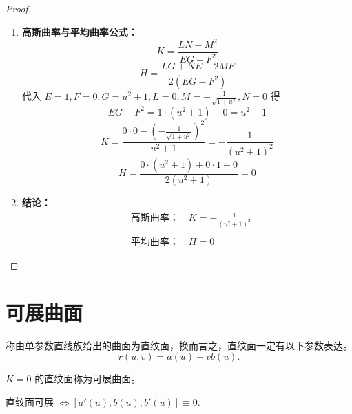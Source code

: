 \documentclass[lang=cn,10pt,thmcnt=section]{elegantbook}
\begin{document}
\begin{proof}
\begin{enumerate}
        \item \textbf{高斯曲率与平均曲率公式：}
        \[
        K = \frac{LN - M^2}{EG - F^2}
        \]
        \[
        H = \frac{LG + NE - 2MF}{2(EG - F^2)}
        \]
        代入 $E=1, F=0, G=u^2+1, L=0, M=-\frac{1}{\sqrt{1+u^2}}, N=0$ 得
        \[
        EG - F^2 = 1 \cdot (u^2+1) - 0 = u^2+1
        \]
        \[
        K = \frac{0 \cdot 0 - \left(-\frac{1}{\sqrt{1+u^2}}\right)^2}{u^2+1} = -\frac{1}{(u^2+1)^2}
        \]
        \[
        H = \frac{0 \cdot (u^2+1) + 0 \cdot 1 - 0}{2(u^2+1)} = 0
        \]

        \item \textbf{结论：}
        \[
        \boxed{
            \begin{aligned}
                &\text{高斯曲率：} \quad K = -\frac{1}{(u^2+1)^2} \\\\
                &\text{平均曲率：} \quad H = 0
            \end{aligned}
        }
        \]
    \end{enumerate}
\end{proof}
\section{可展曲面}
\begin{definition}[直纹面]
    称由单参数直线族给出的曲面为直纹面，换而言之，直纹面一定有以下参数表达。
\[
r(u,v) = a(u) + v b(u).
\]
\end{definition}
\begin{definition}[可展曲面]
    $K=0$ 的直纹面称为可展曲面。
\end{definition}
\begin{proposition}
    直纹面可展 $\Leftrightarrow [a'(u), b(u), b'(u)] \equiv 0$.
\end{proposition}
\end{document}
